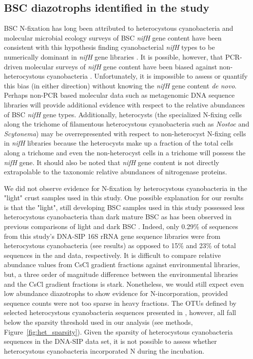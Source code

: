 \subsection{BSC diazotrophs identified in the study}
BSC N-fixation has long been attributed to heterocystous cyanobacteria and
molecular microbial ecology surveys of BSC \textit{nifH} gene content have been
consistent with this hypothesis finding cyanobacterial \textit{nifH} types to
be numerically dominant in \textit{nifH} gene libraries
\citep{Yeager,14766579,Yeager_2012}. It is possible, however, that PCR-driven
molecular surveys of \textit{nifH} gene content have been biased against
non-heterocystous cyanobacteria \citep{Gaby_2012}. Unfortunately, it is impossible to
assess or quantify this bias (in either direction) without knowing the
\textit{nifH} gene content \textit{de novo}. Perhaps non-PCR based molecular
data such as metagenomic DNA sequence libraries will provide additional
evidence with respect to the relative abundances of BSC \textit{nifH} gene
types. Additionally, heterocysts (the specialized N-fixing cells along the
trichome of filamentous heterocystous cyanobacteria such as \textit{Nostoc} and
\textit{Scytonema}) may be overrepresented with respect to non-heterocyst
N-fixing cells in \textit{nifH} libraries because the heterocysts make up a
fraction of the total cells along a trichome and even the non-heterocyst cells
in a trichome will possess the \textit{nifH} gene. It should also be noted that
\textit{nifH} gene content is not directly extrapolable to the taxonomic
relative abundances of nitrogenase proteins.

We did not observe evidence for N-fixation by heterocystous cyanobacteria in
the "light" crust samples used in this study. One possible explanation for our
results is that the "light", still developing BSC samples used in this
study possessed less heterocystous cyanobacteria than dark mature BSC as has
been observed in previous comparisons of light and dark BSC \citep{14766579}.
Indeed, only 0.29\% of sequences from this study's DNA-SIP 16S rRNA gene
sequence libraries were from heterocystous cyanobacteria (see results) as
opposed to 15\% and 23\% of total sequences in the \citet{Steven_2013} and
\citet{Garcia_Pichel_2013} data, respectively. It is difficult to compare
relative abundance values from CsCl gradient fractions against environmental
libraries, but, a three order of magnitude difference between the environmental
libraries and the CsCl gradient fractions is stark. Nonetheless, we would still
expect even low abundance diazotrophs to show evidence for N-incorporation,
provided sequence counts were not too sparse in heavy fractions. The OTUs
defined by selected heterocystous cyanobacteria sequences presented in
\citet{Yeager}, however, all fall below the sparsity threshold used in our
analysis (see methods, Figure~\ref{fig:het_sparsity}). Given the sparsity of
heterocystous cyanobacteria sequences in the DNA-SIP data set, it is not
possible to assess whether heterocystous cyanobacteria incorporated N during
the incubation.

